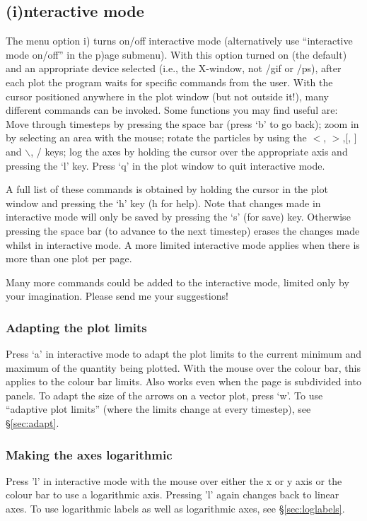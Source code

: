 \documentclass[a4paper,10pt]{article}
\begin{document}
\subsection{(i)nteractive mode}
\label{sec:interactive}
 The menu option i) turns on/off interactive mode (alternatively use ``interactive mode on/off'' in the p)age submenu). With this option turned on (the default) and
an appropriate device selected (i.e., the X-window, not /gif or /ps), after
each plot the program waits for specific commands from the user. With the cursor
positioned anywhere in the plot window (but not outside it!), many different
commands can be invoked. Some functions you may find useful are: Move through timesteps by pressing the space bar (press
 `b' to go back); zoom in by selecting an area with the mouse; rotate the
particles by using the $<$, $>$,[, ] and $\backslash$, / keys; log the axes by holding the cursor
over the appropriate axis and pressing the `l' key. Press `q' in the plot window
to quit interactive mode.

 A full list of these commands is obtained by holding
the cursor in the plot window and pressing the `h' key (h for help). Note that changes made in interactive mode will only be saved by pressing the
`s' (for save) key. Otherwise pressing the space bar (to advance to the next
timestep) erases the changes made whilst in interactive mode. A more limited
interactive mode applies when there is more than one plot per page.

 Many more commands could be added to
the interactive mode, limited only by your imagination. Please send me your suggestions!

\subsubsection{ Adapting the plot limits}
 Press `a' in interactive mode to adapt the plot limits to the current minimum and maximum of the quantity being plotted. With the mouse over the colour bar, this applies to the colour bar limits. Also works even when the page is subdivided into panels. To adapt the size of the arrows on a vector plot, press `w'. To use ``adaptive plot limits'' (where the limits change at every timestep), see \S\ref{sec:adapt}.

\subsubsection{ Making the axes logarithmic}
 Press 'l' in interactive mode with the mouse over either the x or y axis or the colour bar to use a logarithmic axis. Pressing 'l' again changes back to linear axes. To use logarithmic labels as well as logarithmic axes, see \S\ref{sec:loglabels}.
\end{document}
